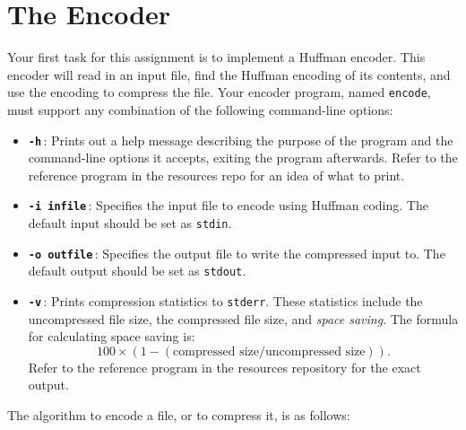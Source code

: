 \documentclass[11pt]{article}
\begin{document}
\section{The Encoder}

Your first task for this assignment is to implement a Huffman encoder.
This encoder will read in an input file, find the Huffman encoding of
its contents, and use the encoding to compress the file. Your encoder
program, named \texttt{encode}, must support any combination of the
following command-line options:

\begin{itemize}
  \item \textbf{\texttt{-h}}\,: Prints out a help message describing the purpose
    of the program and the command-line options it accepts, exiting the
    program afterwards. Refer to the reference program in the resources
    repo for an idea of what to print.

  \item \textbf{\texttt{-i infile}}\,: Specifies the input file to encode using
    Huffman coding. The default input should be set as \texttt{stdin}.

  \item \textbf{\texttt{-o outfile}}\,: Specifies the output file to
    write the compressed input to. The default output should be set as
    \texttt{stdout}.

  \item \textbf{\texttt{-v}}\,: Prints compression statistics to
    \texttt{stderr}. These statistics include the uncompressed file
    size, the compressed file size, and \emph{space saving}. The formula
    for calculating space saving is:
    \[
        100 \times (1 - (\text{compressed size} / \text{uncompressed
        size})).
    \]
    Refer to the reference program in the resources repository for the
    exact output.
\end{itemize}

\noindent The algorithm to encode a file, or to compress it, is as follows:
\end{document}
